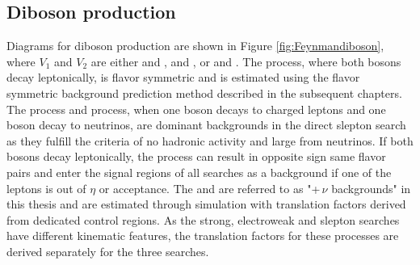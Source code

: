 \subsection*{Diboson production}
\noindent
\justify
Diagrams for diboson production are shown in Figure \ref{fig:Feynmandiboson}, where $V_1$ and $V_2$ are either \PW and \PW, \PZ and \PZ, or \PW and \PZ. 
The \PWW process, where both \PW bosons decay leptonically, is flavor symmetric and is estimated using the flavor symmetric background prediction method described in the subsequent chapters. 
The \PZZ process and \PWZ process, when one \PZ boson decays to charged leptons and one \PZ boson decay to neutrinos, are dominant backgrounds in the direct slepton search as they fulfill the criteria of no hadronic activity and large \ptmiss from neutrinos. 
If both bosons decay leptonically, the \PWZ process can result in opposite sign same flavor pairs and enter the signal regions of all searches as a background if one of the leptons is out of $\eta$ or \pt acceptance. 
\newpara
\noindent\justify
The \PZZ and \PWZ are referred to as "\PZ+$\,\nu$ backgrounds" in this thesis and are estimated through simulation with translation factors derived from dedicated control regions. 
As the strong, electroweak and slepton searches have different kinematic features, the translation factors for these processes are derived separately for the three searches.
